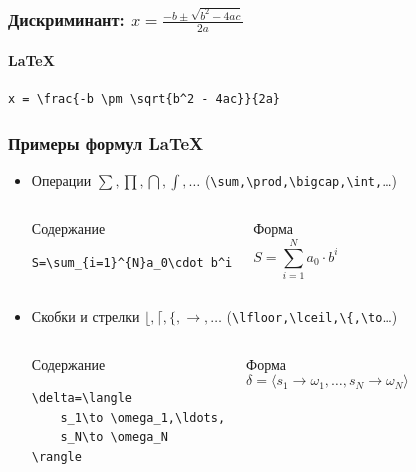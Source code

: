 \begin{frame}[fragile]
\frametitle{Дискриминант: $x = \frac{-b \pm \sqrt{b^2 - 4ac}}{2a}$}
\framesubtitle{\LaTeX}
\begin{verbatim}
x = \frac{-b \pm \sqrt{b^2 - 4ac}}{2a}
\end{verbatim}
\end{frame}


\begin{frame}[fragile]
\frametitle{Примеры формул \LaTeX}
\begin{itemize}
    
\item Операции $\sum,\prod,\bigcap,\int,\ldots$ (\verb"\sum,\prod,\bigcap,\int,"\ldots)
    \begin{columns}
            \begin{block}{Содержание}
\begin{verbatim}
S=\sum_{i=1}^{N}a_0\cdot b^i
\end{verbatim}
            \end{block}
        
            \begin{block}{Форма}
\[
S=\sum_{i=1}^{N}a_0\cdot b^i
\]
            \end{block}
    \end{columns}

\item Скобки и стрелки $\lfloor, \lceil, \{, \to,\ldots$ (\verb"\lfloor,\lceil,\{,\to"\ldots)
    \begin{columns}
            \begin{block}{Содержание}
\begin{verbatim}
\delta=\langle 
    s_1\to \omega_1,\ldots,
    s_N\to \omega_N
\rangle
\end{verbatim}
            \end{block}
        
            \begin{block}{Форма}
\[\delta=\langle 
    s_1\to \omega_1,\ldots,
    s_N\to \omega_N
\rangle\]
            \end{block}
    \end{columns}

\end{itemize}
\end{frame}


